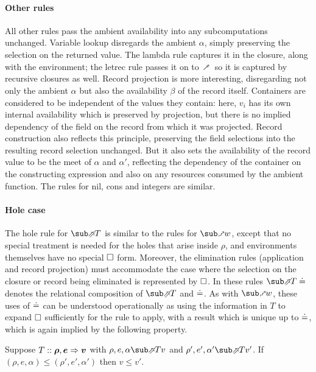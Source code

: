 \paragraph{Other rules} All other rules pass the ambient availability into any subcomputations unchanged. Variable lookup disregards the ambient $\alpha$, simply preserving the selection on the returned value. The lambda rule captures it in the closure, along with the environment; the letrec rule passes it on to $\closeDefsFwdR$ so it is captured by recursive closures as well. Record projection is more interesting, disregarding not only the ambient $\alpha$ but also the availability $\beta$ of the record itself. Containers are considered to be independent of the values they contain: here, $v_i$ has its own internal availability which is preserved by projection, but there is no implied dependency of the field on the record from which it was projected. Record construction also reflects this principle, preserving the field selections into the resulting record selection unchanged. But it also sets the availability of the record value to be the meet of $\alpha$ and $\alpha'$, reflecting the dependency of the container on the constructing expression and also on any resources consumed by the ambient function. The rules for nil, cons and integers are similar.

\paragraph{Hole case} The hole rule for $\evalFwdF{T}$  is similar to the rules for $\matchFwdF{w}$, except that no special treatment is needed for the holes that arise inside $\rho$, and environments themselves have no special $\square$ form. Moreover, the elimination rules (application and record projection) must accommodate the case where the selection on the closure or record being eliminated is represented by $\square$. In these rules $\evalFwdR{T}\eq$ denotes the relational composition of $\evalFwdR{T}$ and $\doteq$. As with $\matchFwdF{w}$, these uses of $\doteq$ can be understood operationally as using the information in $T$ to expand $\square$ sufficiently for the rule to apply, with a result which is unique up to $\doteq$, which is again implied by the following property.

\begin{lemma}
   Suppose $T :: \bm{\rho}, \bm{e} \Rightarrow \bm{v}$ with $\rho, e, \alpha \evalFwdR{T} v$ and $\rho', e', \alpha' \evalFwdR{T} v'$. If $(\rho, e, \alpha) \leq (\rho', e', \alpha')$ then $v \leq v'$.
\end{lemma}

